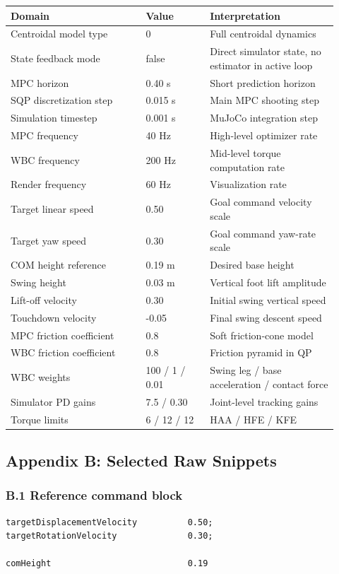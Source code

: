 \documentclass[11pt,a4paper]{article}
\begin{document}
\begin{longtable}{p{0.38\linewidth}p{0.18\linewidth}p{0.36\linewidth}}
\toprule
\textbf{Domain} & \textbf{Value} & \textbf{Interpretation} \\
\midrule
\endhead
Centroidal model type & 0 & Full centroidal dynamics \\
State feedback mode & false & Direct simulator state, no estimator in active loop \\
MPC horizon & 0.40 s & Short prediction horizon \\
SQP discretization step & 0.015 s & Main MPC shooting step \\
Simulation timestep & 0.001 s & MuJoCo integration step \\
MPC frequency & 40 Hz & High-level optimizer rate \\
WBC frequency & 200 Hz & Mid-level torque computation rate \\
Render frequency & 60 Hz & Visualization rate \\
Target linear speed & 0.50 & Goal command velocity scale \\
Target yaw speed & 0.30 & Goal command yaw-rate scale \\
COM height reference & 0.19 m & Desired base height \\
Swing height & 0.03 m & Vertical foot lift amplitude \\
Lift-off velocity & 0.30 & Initial swing vertical speed \\
Touchdown velocity & -0.05 & Final swing descent speed \\
MPC friction coefficient & 0.8 & Soft friction-cone model \\
WBC friction coefficient & 0.8 & Friction pyramid in QP \\
WBC weights & 100 / 1 / 0.01 & Swing leg / base acceleration / contact force \\
Simulator PD gains & 7.5 / 0.30 & Joint-level tracking gains \\
Torque limits & 6 / 12 / 12 & HAA / HFE / KFE \\
\bottomrule
\end{longtable}

\subsection{Appendix B: Selected Raw Snippets}

\subsubsection*{B.1 Reference command block}
\begin{lstlisting}[style=cfgstyle]
targetDisplacementVelocity          0.50;
targetRotationVelocity              0.30;

comHeight                           0.19
\end{lstlisting}
\end{document}
